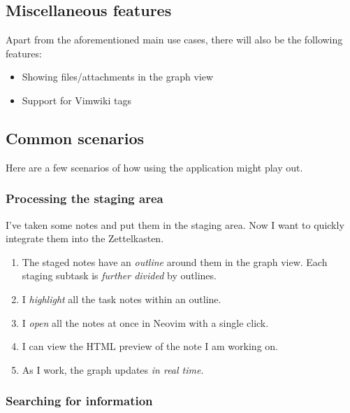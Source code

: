 \documentclass{article}
\begin{document}
\subsection{Miscellaneous features}

Apart from the aforementioned main use cases, there will also be the following features:

\begin{itemize}
	\item Showing files/attachments in the graph view

	\item Support for Vimwiki tags
\end{itemize}

\subsection{Common scenarios} %

Here are a few scenarios of how using the application might play out.

\subsubsection{Processing the staging area}

I've taken some notes and put them in the staging area. Now I want to quickly integrate them into the Zettelkasten.

\begin{enumerate}
	\item The staged notes have an \emph{outline} around them in the graph view. Each staging subtask is \emph{further divided} by outlines.

	\item I \emph{highlight} all the task notes within an outline.

	\item I \emph{open} all the notes at once in Neovim with a single click.

	\item I can view the HTML preview of the note I am working on.

	\item As I work, the graph updates \emph{in real time}.
\end{enumerate}

\subsubsection{Searching for information}
\end{document}
